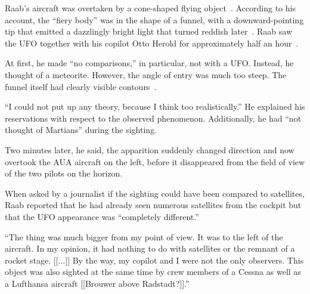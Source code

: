 Raab's aircraft was overtaken by a cone-shaped flying object~\cite[p.~165]{Muller2021Nov}.
According to his account, the ``fiery body'' was in the shape of a funnel, with a downward-pointing tip
that emitted a dazzlingly bright light that turned reddish later~\cite{Raab-Kletter-Linz}.
Raab saw the UFO together with his copilot Otto Herold for approximately half an hour~\cite[p.~165]{Muller2021Nov}.

At first, he made ``no comparisons,'' in particular, not with a UFO.
Instead, he thought of a meteorite. However, the angle of entry was much too steep.
The funnel itself had clearly visible contours~\cite{Raab-Kletter-Linz}.

``I could not put up any theory, because I think too realistically.''
He explained his reservations with respect to the observed phenomenon.
Additionally, he had ``not thought of Martians'' during the sighting.

Two minutes later, he said, the apparition suddenly changed direction and now overtook the AUA aircraft on the left,
before it disappeared from the field of view of the two pilots on the horizon.

When asked by a journalist if the sighting could have been compared to satellites,
Raab reported that he had already seen numerous satellites from the cockpit but that the UFO appearance was ``completely different.''
\begin{svgraybox}
``The thing was much bigger from my point of view.
It was to the left of the aircraft.
In my opinion, it had nothing to do with satellites or the remnant of a rocket stage.
[[$\ldots$]] By the way, my copilot and I were not the only observers.
This object was also sighted at the same time by crew members of a Cessna as well as a Lufthansa aircraft [[Brouwer above Radstadt?]].''
\end{svgraybox}

